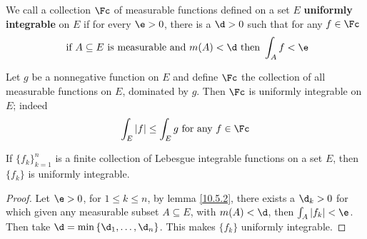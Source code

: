 \begin{definition}
    We call a collection $\Fc$ of measurable functions defined on a set  $E$
     \textbf{uniformly integrable} on $E$ if for every $\e>0$, there is a $\d>0$
     such that for any $f \in \Fc$
     \begin{equation*}
         \text{ if } A \subseteq E \text{ is measurable and }
         m(A)<\d \text{ then } \int_A{f}<\e
     \end{equation*}
\end{definition}

\begin{example}\label{example_10.5}
    Let $g$ be a nonnegative function on  $E$ and define $\Fc$ the collection of
    all measurable functions on  $E$, dominated by  $g$. Then  $\Fc$ is
    uniformly integrable on  $E$; indeed
    \begin{equation*}
        \int_E{|f|} \leq \int_E{g} \text{ for any } f \in \Fc
    \end{equation*}
\end{example}

\begin{lemma}\label{10.5.3}
    If $\{f_k\}_{k=1}^n$ is a finite collection of Lebesgue integrable functions
    on a set $E$, then $\{f_k\}$ is uniformly integrable.
\end{lemma}
\begin{proof}
    Let $\e>0$, for  $1 \leq k \leq n$, by lemma \ref{10.5.2}, there exists a
    $\d_k>0$ for which given any measurable subset $A \subseteq E$, with
    $m(A)<\d$, then $\int_A{|f_k|}<\e$. Then take $\d=\min{\{\d_1, \dots,
    \d_n\}}$. This makes $\{f_k\}$ uniformly integrable.
\end{proof}

